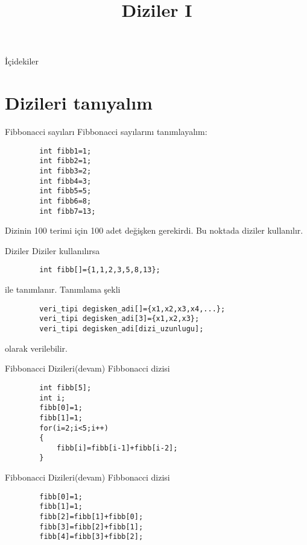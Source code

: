 
\title[Ders 4] {Diziler I}

\frame{\titlepage}
\begin{frame}[fragile]{İçidekiler}
    \tableofcontents
\end{frame}
\section{Dizileri tanıyalım}
\begin{frame}[fragile]{Fibbonacci sayıları}
    Fibbonacci sayılarını tanımlayalım: 
    \begin{lstlisting}
        int fibb1=1;    
        int fibb2=1;    
        int fibb3=2;    
        int fibb4=3;    
        int fibb5=5;    
        int fibb6=8;    
        int fibb7=13;\end{lstlisting}
    Dizinin 100 terimi için 100 adet değişken gerekirdi. Bu noktada diziler kullanılır.
\end{frame}
\begin{frame}[fragile]{Diziler}
    Diziler kullanılırsa
    \begin{lstlisting}
        int fibb[]={1,1,2,3,5,8,13};\end{lstlisting}
        ile tanımlanır. Tanımlama şekli
    \begin{lstlisting}
        veri_tipi degisken_adi[]={x1,x2,x3,x4,...};
        veri_tipi degisken_adi[3]={x1,x2,x3};
        veri_tipi degisken_adi[dizi_uzunlugu];
    \end{lstlisting}
    olarak verilebilir.
\end{frame}
\begin{frame}[fragile]{Fibbonacci Dizileri(devam)}
    Fibbonacci dizisi 
    \begin{lstlisting}
        int fibb[5];
        int i;
        fibb[0]=1;
        fibb[1]=1;
        for(i=2;i<5;i++)
        {
            fibb[i]=fibb[i-1]+fibb[i-2];
        }
    \end{lstlisting}
\end{frame}
\begin{frame}[fragile]{Fibbonacci Dizileri(devam)}
    Fibbonacci dizisi 
    \begin{lstlisting}
        fibb[0]=1;
        fibb[1]=1;
        fibb[2]=fibb[1]+fibb[0];
        fibb[3]=fibb[2]+fibb[1];
        fibb[4]=fibb[3]+fibb[2];
    \end{lstlisting}
\end{frame}

